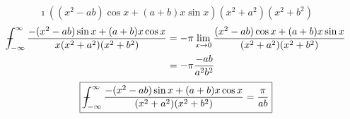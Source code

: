 \begin{Solution}
\begin{enumerate}
\[{      \imath ((x^2 - a b) \cos x + (a+b) x \sin x ) }{ (x^2+a^2)(x^2+b^2) }
    \]
    \begin{align*}
      - \negthickspace \negthickspace \negthickspace \negmedspace\int_{-\infty}^\infty \frac{ - (x^2 - a b) \sin x + (a + b) x \cos x }
      { x (x^2+a^2)(x^2+b^2) }
      &= - \pi \lim_{x \to 0} \frac{ (x^2 - a b) \cos x + (a+b) x \sin x }
      { (x^2+a^2)(x^2+b^2) } \\
      &= - \pi \frac{- a b}{a^2 b^2}
    \end{align*}
    \[
    \boxed{
      - \negthickspace \negthickspace \negthickspace \negmedspace\int_{-\infty}^\infty \frac{ - (x^2 - a b) \sin x + (a + b) x \cos x }
      { (x^2+a^2)(x^2+b^2) } = \frac{\pi}{a b}
      }
    \]
  \end{enumerate}
\end{Solution}



